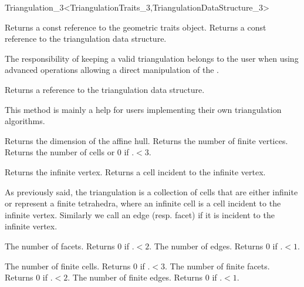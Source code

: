 \begin{ccRefClass}{Triangulation_3<TriangulationTraits_3,TriangulationDataStructure_3>}
\ccAccessFunctions
{}

{Returns a const reference to the geometric traits object.}
\ccGlue
{}
{Returns a const reference to the triangulation data structure.}

\begin{ccAdvanced}
The responsibility of keeping a valid triangulation belongs to the user
when using advanced operations allowing a direct manipulation of the .

{Returns a reference to the triangulation data structure.}

This method is mainly a help for users implementing their own triangulation
algorithms.
 
\end{ccAdvanced}


{Returns the dimension of the affine hull.}
\ccGlue
{}
{Returns the number of finite vertices.}
\ccGlue
{}
{Returns the number of cells or 0 if \ccVar.$<3$.}

{Returns the infinite vertex.}
\ccGlue
{}
{Returns a cell incident to the infinite vertex.}


As previously said, the triangulation is a collection of cells that
are either infinite or represent a finite tetrahedra, where an
infinite cell is a 
cell incident to the infinite vertex. Similarly we call
an edge (resp. facet)  if it is incident to the infinite vertex.

{The number of facets. Returns 0 if \ccVar.$<2$.}
\ccGlue
{}
{The number of edges. Returns 0 if \ccVar.$<1$.}

{The number of finite cells. Returns 0 if \ccVar.$<3$.}
\ccGlue
{}
{The number of finite facets. Returns 0 if \ccVar.$<2$.}
\ccGlue
{}
{The number of finite edges. Returns 0 if \ccVar.$<1$.}


\end{ccRefClass}
